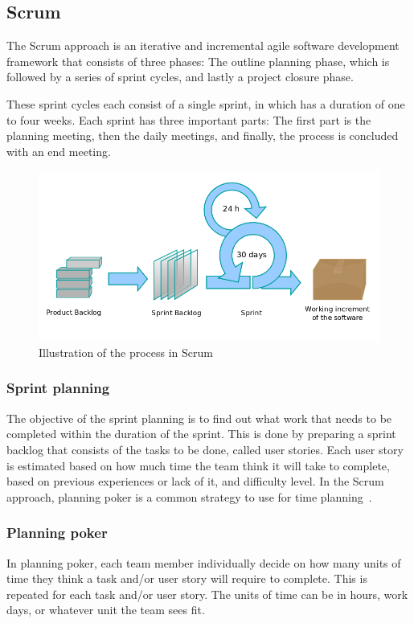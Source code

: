 \newpage
\subsection{Scrum}
\label{sec:scrumProjectManagement}
The Scrum approach is an iterative and incremental agile software development
framework that consists of three phases: The outline planning phase, which is
followed by a series of sprint cycles, and lastly a project closure phase.

These sprint cycles each consist of a single sprint, in which has a duration of
one to four weeks. Each sprint has three important parts: The first part is the
planning meeting, then the daily  meetings, and finally, the process is
concluded with an end meeting.
\begin{figure}[H]
\includegraphics[width=\textwidth]{ch/projectManagement/fig/scrumProcess.png}
\caption{Illustration of the process in Scrum}
\end{figure}


\subsubsection{Sprint planning}
\label{sec:sprintplanning}
The objective of the sprint planning is to find out what work that needs to be completed within the duration of the sprint. This is done by preparing a sprint backlog that consists of the tasks to be done, called user stories. Each user story is estimated based on how much time the team think it will take to complete, based on previous experiences or lack of it, and difficulty level. In the Scrum approach, planning poker is a common strategy to use for time planning~\cite{planningpoker}.

\subsubsection{Planning poker}
In planning poker, each team member individually decide on how many units of time they think a task and/or user story will require to complete. This is repeated for each task and/or user story. The units of time can be in hours, work days, or whatever unit the team sees fit.

